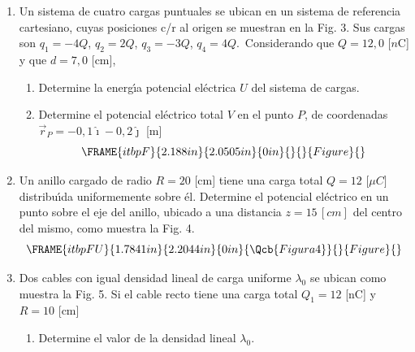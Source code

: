 \documentclass[onecolumn]{article}
\begin{document}
\begin{enumerate}
\item Un sistema de cuatro cargas puntuales se ubican en un sistema de
referencia cartesiano, cuyas posiciones c/r al origen se muestran en la Fig.
3. Sus cargas son $q_{1}=-4Q$, $q_{2}=2Q$, $q_{3}=-3Q$, $q_{4}=4Q$.\
Considerando que $Q=12,0$ [$n$C] y que $d=7,0$ [cm],

\begin{enumerate}
\item Determine la energ\'{\i}a potencial el\'{e}ctrica $U$ del sistema de
cargas.

\item Determine el potencial el\'{e}ctrico total $V$ en el punto $P$, de
coordenadas $\vec{r}_{P}=-0,1\hat{\imath}-0,2\hat{\jmath}$ [m] 
\begin{equation*}
\FRAME{itbpF}{2.188in}{2.0505in}{0in}{}{}{Figure}{\special{language
"Scientific Word";type "GRAPHIC";maintain-aspect-ratio TRUE;display
"USEDEF";valid_file "T";width 2.188in;height 2.0505in;depth
0in;original-width 9.2198in;original-height 8.6343in;cropleft "0";croptop
"1";cropright "1";cropbottom "0";tempfilename
'TLDCM202.bmp';tempfile-properties "XPR";}}
\end{equation*}%
\pagebreak 
\end{enumerate}

\item Un anillo cargado de radio $R=20$ [cm] tiene una carga total $Q=12$ [$%
\mu C]$ distribu\'{\i}da uniformemente sobre \'{e}l. Determine el potencial
el\'{e}ctrico en un punto sobre el eje del anillo, ubicado a una distancia $%
z=15\,[cm]$ del centro del mismo, como muestra la Fig. 4. 
\begin{equation*}
\FRAME{itbpFU}{1.7841in}{2.2044in}{0in}{\Qcb{Figura 4}}{}{Figure}{\special%
{language "Scientific Word";type "GRAPHIC";maintain-aspect-ratio
TRUE;display "USEDEF";valid_file "T";width 1.7841in;height 2.2044in;depth
0in;original-width 5.9637in;original-height 7.3786in;cropleft "0";croptop
"1";cropright "1";cropbottom "0";tempfilename
'TLDD1A03.bmp';tempfile-properties "XPR";}}
\end{equation*}

\item Dos cables con igual densidad lineal de carga uniforme $\lambda _{0}$
se ubican como muestra la Fig. 5. Si el cable recto tiene una carga total $%
Q_{1}=12$ [nC] y $R=10$ [cm]

\begin{enumerate}
\item Determine el valor de la densidad lineal $\lambda _{0}.$


\end{enumerate}
\end{enumerate}
\end{document}

